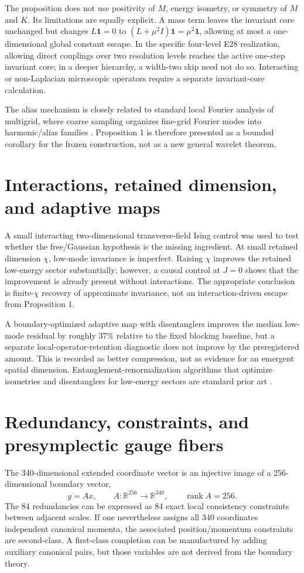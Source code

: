 \documentclass[11pt,a4paper]{article}
\newcommand{\R}{\mathbb{R}}
\newcommand{\rank}{\operatorname{rank}}
\begin{document}
The proposition does not use positivity of $M$, energy isometry, or symmetry of $M$ and $K$. Its limitations are equally explicit. A mass term leaves the invariant core unchanged but changes $L\mathbf1=0$ to $(L+\mu^2I)\mathbf1=\mu^2\mathbf1$, allowing at most a one-dimensional global constant escape. In the specific four-level E28 realization, allowing direct couplings over two resolution levels reaches the active one-step invariant core; in a deeper hierarchy, a width-two skip need not do so. Interacting or non-Laplacian microscopic operators require a separate invariant-core calculation.

The alias mechanism is closely related to standard local Fourier analysis of multigrid, where coarse sampling organizes fine-grid Fourier modes into harmonic/alias families \cite{trottenberg2001,kahl2020}. Proposition 1 is therefore presented as a bounded corollary for the frozen construction, not as a new general wavelet theorem.

\section{Interactions, retained dimension, and adaptive maps}
A small interacting two-dimensional transverse-field Ising control was used to test whether the free/Gaussian hypothesis is the missing ingredient. At small retained dimension $\chi$, low-mode invariance is imperfect. Raising $\chi$ improves the retained low-energy sector substantially; however, a causal control at $J=0$ shows that the improvement is already present without interactions. The appropriate conclusion is finite-$\chi$ recovery of approximate invariance, not an interaction-driven escape from Proposition 1.

A boundary-optimized adaptive map with disentanglers improves the median low-mode residual by roughly 37\% relative to the fixed blocking baseline, but a separate local-operator-retention diagnostic does not improve by the preregistered amount. This is recorded as better compression, not as evidence for an emergent spatial dimension. Entanglement-renormalization algorithms that optimize isometries and disentanglers for low-energy sectors are standard prior art \cite{evenbly2009alg,evenbly2009}.

\section{Redundancy, constraints, and presymplectic gauge fibers}
The 340-dimensional extended coordinate vector is an injective image of a 256-dimensional boundary vector,
\begin{equation}
y=Ax,\qquad A:\R^{256}\rightarrow\R^{340},\qquad \rank A=256.
\end{equation}
The 84 redundancies can be expressed as 84 exact local consistency constraints between adjacent scales. If one nevertheless assigns all 340 coordinates independent canonical momenta, the associated position/momentum constraints are second-class. A first-class completion can be manufactured by adding auxiliary canonical pairs, but those variables are not derived from the boundary theory.
\end{document}
